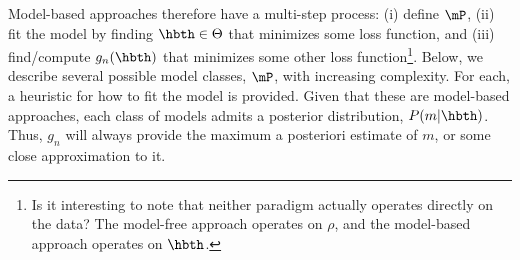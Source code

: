 Model-based approaches therefore have a multi-step process: (i) define $\mP$, (ii) fit the model by finding $\hbth \in \Theta$ that minimizes some loss function, and (iii) find/compute $g_n(\hbth)$ that minimizes some other loss function\footnote{Is it interesting to note that neither paradigm actually operates directly on the data? The model-free approach operates on $\rho$, and the model-based approach operates on $\hbth$.}.  
Below, we describe several possible model classes, $\mP$, with increasing complexity.  For each, a heuristic for how to fit the model is provided.  Given that these are model-based approaches, each class of models admits a posterior distribution, $P(m | \hbth)$.  Thus, $g_n$ will always provide the maximum a posteriori estimate of $m$, or some close approximation to it. %

